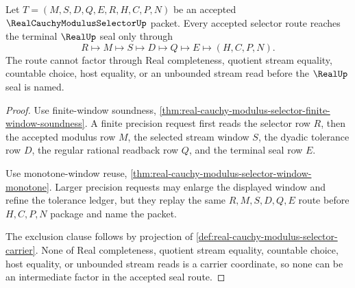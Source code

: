 \begin{theorem}
\label{thm:real-cauchy-modulus-selector-seal-factorization}
Let $T=(M,S,D,Q,E,R,H,C,P,N)$ be an accepted $\RealCauchyModulusSelectorUp$ packet. Every accepted selector route reaches the terminal $\RealUp$ seal only through
$$
R\longmapsto M\longmapsto S\longmapsto D\longmapsto Q\longmapsto E\longmapsto(H,C,P,N).
$$
The route cannot factor through Real completeness, quotient stream equality, countable choice, host equality, or an unbounded stream read before the $\RealUp$ seal is named.
\end{theorem}
\begin{proof}
Use finite-window soundness, \autoref{thm:real-cauchy-modulus-selector-finite-window-soundness}. A finite precision request first reads the selector row $R$, then the accepted modulus row $M$, the selected stream window $S$, the dyadic tolerance row $D$, the regular rational readback row $Q$, and the terminal seal row $E$.

Use monotone-window reuse, \autoref{thm:real-cauchy-modulus-selector-window-monotone}. Larger precision requests may enlarge the displayed window and refine the tolerance ledger, but they replay the same $R,M,S,D,Q,E$ route before $H,C,P,N$ package and name the packet.

The exclusion clause follows by projection of \autoref{def:real-cauchy-modulus-selector-carrier}. None of Real completeness, quotient stream equality, countable choice, host equality, or unbounded stream reads is a carrier coordinate, so none can be an intermediate factor in the accepted seal route.
\end{proof}

